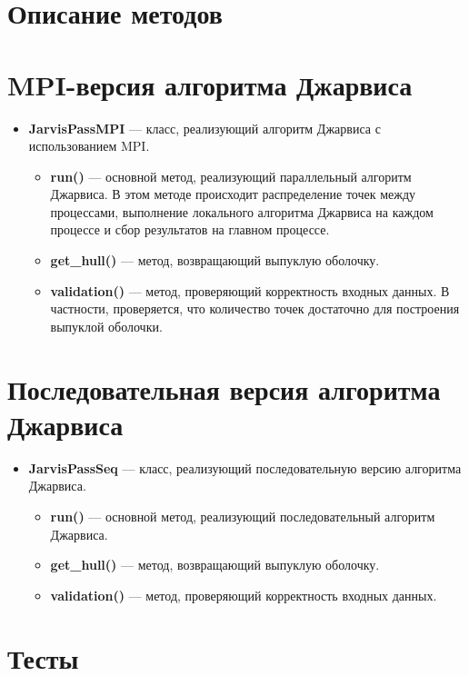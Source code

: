 \documentclass[12pt]{article}
\begin{document}
\section*{Описание методов}

\section*{MPI-версия алгоритма Джарвиса}

\begin{itemize}
\item \textbf{JarvisPassMPI} — класс, реализующий алгоритм Джарвиса с использованием MPI.
\begin{itemize}
\item \textbf{run()} — основной метод, реализующий параллельный алгоритм Джарвиса. В этом методе происходит распределение точек между процессами, выполнение локального алгоритма Джарвиса на каждом процессе и сбор результатов на главном процессе.
\item \textbf{get_hull()} — метод, возвращающий выпуклую оболочку.
\item \textbf{validation()} — метод, проверяющий корректность входных данных. В частности, проверяется, что количество точек достаточно для построения выпуклой оболочки.
\end{itemize}
\end{itemize}

\section*{Последовательная версия алгоритма Джарвиса}

\begin{itemize}
\item \textbf{JarvisPassSeq} — класс, реализующий последовательную версию алгоритма Джарвиса.
\begin{itemize}
\item \textbf{run()} — основной метод, реализующий последовательный алгоритм Джарвиса.
\item \textbf{get_hull()} — метод, возвращающий выпуклую оболочку.
\item \textbf{validation()} — метод, проверяющий корректность входных данных.
\end{itemize}
\end{itemize}

\section*{Тесты}
\end{document}
